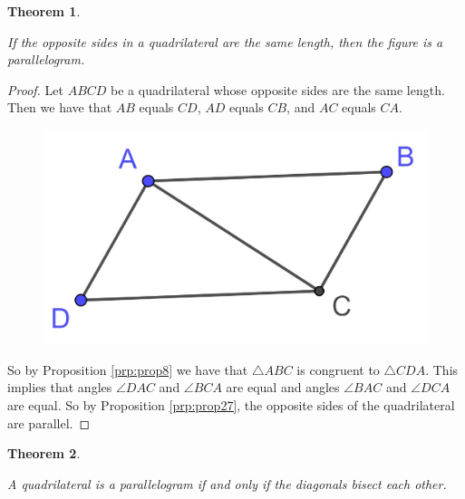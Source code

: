 \documentclass[
]{book}
\newtheorem{theorem}{Theorem}[chapter]
\theoremstyle{definition}
\theoremstyle{definition}
\theoremstyle{definition}
\theoremstyle{definition}
\theoremstyle{remark}
\begin{document}
\begin{theorem}
\protect\hypertarget{thm:parallelogram-opposite-sides}{}\label{thm:parallelogram-opposite-sides}

If the opposite sides in a quadrilateral are the same length, then the figure is a parallelogram.

\end{theorem}

\begin{proof}

Let \(ABCD\) be a quadrilateral whose opposite sides are the same length. Then we have that \(AB\) equals \(CD\), \(AD\) equals \(CB\), and \(AC\) equals \(CA\).

\begin{figure}

{\centering \includegraphics[width=0.2\linewidth]{images/Parallelogram1} 

}

\end{figure}

So by Proposition \ref{prp:prop8} we have that \(\triangle ABC\) is congruent to \(\triangle CDA\). This implies that angles \(\angle DAC\) and \(\angle BCA\) are equal and angles \(\angle BAC\) and \(\angle DCA\) are equal. So by Proposition \ref{prp:prop27}, the opposite sides of the quadrilateral are parallel.

\end{proof}

\begin{theorem}
\protect\hypertarget{thm:unlabeled-div-161}{}\label{thm:unlabeled-div-161}

A quadrilateral is a parallelogram if and only if the diagonals bisect each other.

\end{theorem}
\end{document}
